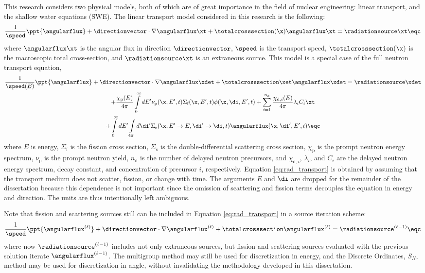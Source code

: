 This research considers two physical models, both of which are of
great importance in the field of nuclear engineering:
linear transport, and the shallow water equations (SWE).
The linear transport model considered in this research is the following:
\begin{equation}\label{eq:rad_transport}
  \frac{1}{\speed}\ppt{\angularflux} + \directionvector\cdot\nabla\angularflux\xt
  + \totalcrosssection(\x)\angularflux\xt = \radiationsource\xt \eqc
\end{equation}
where $\angularflux\xt$ is the angular flux in direction $\directionvector$,
$\speed$ is the transport speed, $\totalcrosssection(\x)$
is the macroscopic total cross-section, and $\radiationsource\xt$ is an
extraneous source.
This model is a special case of the full neutron transport equation,
\begin{multline}
  \frac{1}{\speed(E)}\ppt{\angularflux} + \directionvector\cdot\nabla\angularflux\xdet
    + \totalcrosssection\xet\angularflux\xdet = \radiationsource\xdet\\
    + \frac{\chi_\text{p}(E)}{4\pi}\int\limits_0^\infty
      dE'\nu_\text{p}(\x,E',t)\Sigma_\text{f}(\x,E',t)\phi(\x,\di,E',t)
    + \sum\limits_{i=1}^{n_\text{d}}\frac{\chi_{\text{d},i}(E)}{4\pi}\lambda_i C_i\xt\\
    + \int\limits_0^\infty dE'\int\limits_{4\pi}d\di'
      \Sigma_\text{s}(\x,E'\rightarrow E,\di'\rightarrow\di,t)\angularflux(\x,\di',E',t)
  \eqc
\end{multline}
where $E$ is energy, $\Sigma_\text{f}$ is the fission cross section, $\Sigma_\text{s}$ is the
double-differential scattering cross section, $\chi_\text{p}$ is the prompt
neutron energy spectrum, $\nu_\text{p}$ is the prompt
neutron yield, $n_\text{d}$ is the number of delayed neutron precursors,
and $\chi_{\text{d},i}$, $\lambda_i$, and $C_i$ are the delayed neutron
energy spectrum, decay constant, and concentration of precursor $i$, respectively.
Equation \eqref{eq:rad_transport} is obtained by assuming that the transport
medium does not scatter, fission, or change with time. The arguments
$E$ and $\di$ are dropped for the remainder of the dissertation
because this dependence is not important since the omission of scattering
and fission terms decouples the equation in energy and direction.
The units are thus intentionally left ambiguous.

Note that fission and scattering sources still can be included in Equation
\eqref{eq:rad_transport} in a source iteration scheme:
\begin{equation}
  \frac{1}{\speed}\ppt{\angularflux^{(\ell)}}
    + \directionvector\cdot\nabla\angularflux^{(\ell)}
    + \totalcrosssection\angularflux^{(\ell)} = \radiationsource^{(\ell-1)} \eqc
\end{equation}
where now $\radiationsource^{(\ell-1)}$ includes not only extraneous
sources, but fission and scattering sources evaluated with the previous
solution iterate $\angularflux^{(\ell-1)}$. The multigroup
method may still be used for discretization in energy, and the
Discrete Ordinates, $S_N$, method may be used for discretization
in angle, without invalidating the methodology developed in this dissertation.


